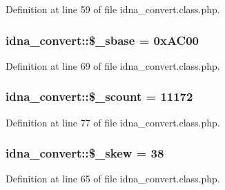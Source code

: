 Definition at line 59 of file idna\+\_\+convert.\+class.\+php.

\hypertarget{classidna__convert_ab4e5849131d5a242fc67d3bb75f81899}{}
\subsubsection[{\$\+\_\+sbase}]{\setlength{\rightskip}{0pt plus 5cm}idna\+\_\+convert\+::\$\+\_\+sbase = 0x\+A\+C00\hspace{0.3cm}{\ttfamily [protected]}}\label{classidna__convert_ab4e5849131d5a242fc67d3bb75f81899}


Definition at line 69 of file idna\+\_\+convert.\+class.\+php.

\hypertarget{classidna__convert_aa422586662f0878841bd8dcda663c058}{}
\subsubsection[{\$\+\_\+scount}]{\setlength{\rightskip}{0pt plus 5cm}idna\+\_\+convert\+::\$\+\_\+scount = 11172\hspace{0.3cm}{\ttfamily [protected]}}\label{classidna__convert_aa422586662f0878841bd8dcda663c058}


Definition at line 77 of file idna\+\_\+convert.\+class.\+php.

\hypertarget{classidna__convert_ae444bd5e85604ec097705a95ab21f144}{}
\subsubsection[{\$\+\_\+skew}]{\setlength{\rightskip}{0pt plus 5cm}idna\+\_\+convert\+::\$\+\_\+skew = 38\hspace{0.3cm}{\ttfamily [protected]}}\label{classidna__convert_ae444bd5e85604ec097705a95ab21f144}


Definition at line 65 of file idna\+\_\+convert.\+class.\+php.

\hypertarget{classidna__convert_a6457ade57cb55c7b44bfbf8686c2c2d5}{}
